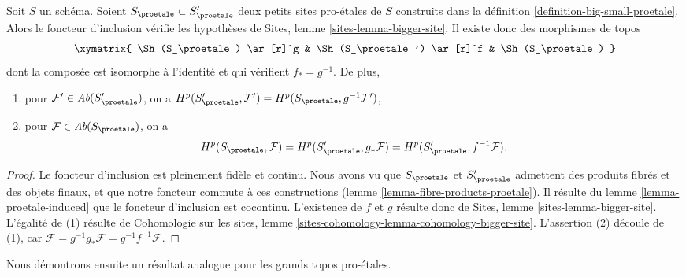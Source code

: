 \begin{lemma}
\label{lemma-proetale-cohomology-independent-partial-universe}
Soit $S$ un schéma. Soient $S_\proetale \subset S_\proetale'$ deux
petits sites pro-\'etales de $S$ construits dans la
définition \ref{definition-big-small-proetale}. Alors le foncteur d'inclusion
vérifie les hypothèses de
Sites, lemme \ref{sites-lemma-bigger-site}.
Il existe donc des morphismes de topos
$$
\xymatrix{
\Sh(S_\proetale) \ar[r]^g &
\Sh(S_\proetale') \ar[r]^f &
\Sh(S_\proetale)
}
$$
dont la composée est isomorphe à l'identité et qui vérifient $f_* = g^{-1}$.
De plus,
\begin{enumerate}
\item pour $\mathcal{F}' \in \textit{Ab}(S_\proetale')$, on a
$H^p(S_\proetale', \mathcal{F}') = H^p(S_\proetale, g^{-1}\mathcal{F}')$,
\item pour $\mathcal{F} \in \textit{Ab}(S_\proetale)$, on a
$$
H^p(S_\proetale, \mathcal{F}) =
H^p(S_\proetale', g_*\mathcal{F}) =
H^p(S_\proetale', f^{-1}\mathcal{F}).
$$
\end{enumerate}
\end{lemma}

\begin{proof}
Le foncteur d'inclusion est pleinement fidèle et continu.
Nous avons vu que $S_\proetale$ et $S_\proetale'$ admettent des produits fibrés
et des objets finaux, et que notre foncteur commute à ces constructions
(lemme \ref{lemma-fibre-products-proetale}).
Il résulte du lemme \ref{lemma-proetale-induced}
que le foncteur d'inclusion est cocontinu.
L'existence de $f$ et $g$ résulte donc de
Sites, lemme \ref{sites-lemma-bigger-site}.
L'égalité de (1) résulte de
Cohomologie sur les sites, lemme \ref{sites-cohomology-lemma-cohomology-bigger-site}.
L'assertion (2) découle de (1), car
$\mathcal{F} = g^{-1}g_*\mathcal{F} = g^{-1}f^{-1}\mathcal{F}$.
\end{proof}

\noindent
Nous démontrons ensuite un résultat analogue pour les grands topos pro-\'etales.

